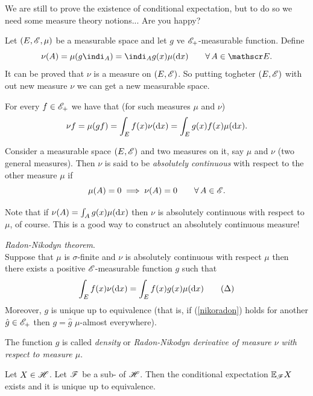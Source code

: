 \documentclass{report}
\begin{document}
We are still to prove the existence of conditional expectation, but to do so we need some measure theory notions... Are you happy?
\begin{revise}
	Let $(E,\mathscr{E},\mu)$ be a measurable space and let $g$ ve $\mathscr{E}_+$-measurable function. Define
	\begin{equation*}
		\nu(A)=\mu(g\indi_A)=\indi_Ag(x)\mu(\dx)\qquad\every A\in\E.
	\end{equation*}
	It can be proved that $\nu$ is a measure on $(E,\mathscr{E})$. So putting togheter $(E,\mathscr{E})$ with out new measure $\nu$ we can get a new measurable space.
	\begin{proposition}
		For every $f\in\mathscr{E}_+$ we have that (for such measures $\mu$ and $\nu$)
		\begin{equation*}
			\nu f=\mu(gf)=\int_Ef(x)\nu(\mathop{}\!\mathrm{d} x)=\int_E g(x)f(x)\mu(\mathop{}\!\mathrm{d} x).
		\end{equation*}
	\end{proposition}
	\begin{definition}
		Consider a measurable space $(E,\mathscr{E})$ and two measures on it, say $\mu$ and $\nu$ (two general measures). Then $\nu$ is said to be\emph{ absolutely continuous }with respect to the other measure $\mu$ if
		\begin{equation*}
			\mu(A)=0\implies\nu(A)=0\qquad \forall\, A\in\mathscr{E}.
		\end{equation*}
	\end{definition}
	Note that if $\nu(A)=\int_A g(x)\mu(\mathop{}\!\mathrm{d} x)$ then $\nu$ is absolutely continuous with respect to $\mu$, of course. This is a good way to construct an absolutely continuous measure!
	\begin{theorem}
		\emph{Radon-Nikodyn theorem}.\\
		Suppose that $\mu$ is $\sigma$-finite and $\nu$ is absolutely continuous with respect $\mu$ then there exists a positive $\mathscr{E}$-measurable function $g$ such that
		\begin{equation}
			\int_E f(x)\nu(\mathop{}\!\mathrm{d} x)=\int_E f(x)g(x)\mu(\mathop{}\!\mathrm{d} x)\tag{$\Delta$} \label{nikoradon}
		\end{equation}
		Moreover, $g$ is unique up to equivalence (that is, if (\ref{nikoradon}) holds for another $\hat{g}\in\mathscr{E}_+$ then $g=\hat{g}$ $\mu$-almost everywhere).
	\end{theorem}
	The function $g$ is called \emph{density} or \emph{Radon-Nikodyn derivative of measure $\nu$ with respect to measure $\mu$}.
\end{revise}
\begin{theorem}
	Let $X\in\mathscr{H}$. Let $\mathscr{F}$ be a sub-\sa{} of $\mathscr{H}$. Then the conditional expectation $\mathbb{E}_{\mathscr{F}} X$ exists and it is unique up to equivalence.
\end{theorem}
\end{document}

